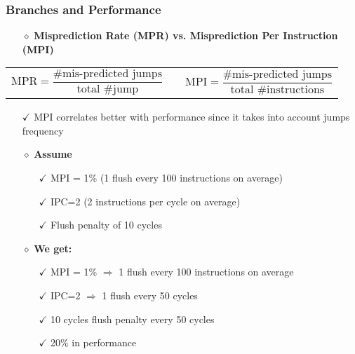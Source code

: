\documentclass{beamer}
\begin{document}
\begin{frame}
\frametitle{\textcolor{myblue}{Branches and Performance}}

\begin{itemize}
    \item[$\diamond$] \textbf{Misprediction Rate (MPR) vs. Misprediction Per Instruction (MPI)}
\end{itemize}

\vspace{0.3cm}

\begin{center}
\begin{tabular}{ccc}
$\text{MPR} = \dfrac{\text{\# mis-predicted jumps}}{\text{total \# jump}}$ & \hspace{1cm} & $\text{MPI} = \dfrac{\text{\# mis-predicted jumps}}{\text{total \# instructions}}$
\end{tabular}
\end{center}

\vspace{0.3cm}

\begin{itemize}
    \item[$\checkmark$] MPI correlates better with performance since it takes into account jumps frequency
\end{itemize}

\vspace{0.2cm}

\begin{itemize}
    \item[$\diamond$] \textbf{Assume}
    \begin{itemize}
        \item[$\checkmark$] MPI = 1\% (1 flush every 100 instructions on average)
        \item[$\checkmark$] IPC=2 \hspace{0.5cm} (2 instructions per cycle on average)
        \item[$\checkmark$] Flush penalty of 10 cycles
    \end{itemize}
\end{itemize}

\vspace{0.2cm}

\begin{itemize}
    \item[$\diamond$] \textbf{We get:}
    \begin{itemize}
        \item[$\checkmark$] MPI = 1\% $\Rightarrow$ 1 flush every 100 instructions on average
        \item[$\checkmark$] IPC=2 $\Rightarrow$ 1 flush every 50 cycles
        \item[$\checkmark$] 10 cycles flush penalty every 50 cycles
        \item[$\checkmark$] 20\% in performance
    \end{itemize}
\end{itemize}

\end{frame}
\end{document}
